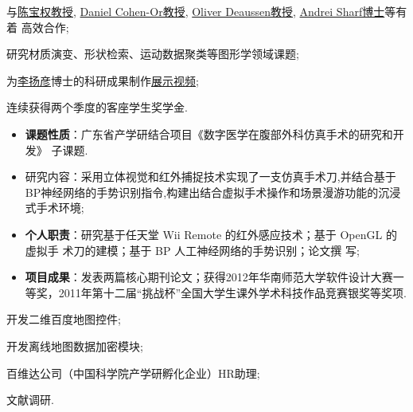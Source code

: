 \documentclass[11pt,a4paper,nolmodern]{moderncv}
\begin{document}

{
\begin{tightitemize}%
 \item 与\href{http://web.siat.ac.cn/~baoquan/}{陈宝权教授},
   \href{http://www.math.tau.ac.il/~dcor/}{Daniel Cohen-Or教授},
   \href{http://graphics.uni-konstanz.de/mitarbeiter/deussen.php}{Oliver
     Deaussen教授}, \href{http://www.idav.ucdavis.edu/~asharf/}{Andrei Sharf博士}等有着
   高效合作;
 \item 研究材质演变、形状检索、运动数据聚类等图形学领域课题;
 \item 为\href{http://web.siat.ac.cn/~yangyan/}{李扬彦}博士的科研成果制作\href{http://hahack.com/life/video-released}{展示视频};
  \item 连续获得两个季度的客座学生奖学金.
 \end{tightitemize}}

%
  {
\begin{itemize}
 \item \textbf{课题性质}：广东省产学研结合项目《数字医学在腹部外科仿真手术的研究和开发》 子课题.
 \item 研究内容：采用立体视觉和红外捕捉技术实现了一支仿真手术刀,并结合基于BP神经网络的手势识别指令,构建出结合虚拟手术操作和场景漫游功能的沉浸式手术环境;
 \item \textbf{个人职责}：研究基于任天堂 Wii Remote 的红外感应技术；基于 OpenGL 的虚拟手
   术刀的建模；基于 BP 人工神经网络的手势识别；论文撰
   写;
 \item \textbf{项目成果}：发表两篇核心期刊论文；获得2012年华南师范大学软件设计大赛一等奖，2011年第十二届“挑战杯”全国大学生课外学术科技作品竞赛银奖等奖项.
\end{itemize}}

{
\begin{tightitemize}%
 \item 开发二维百度地图控件;
 \item 开发离线地图数据加密模块;
 \item 百维达公司（中国科学院产学研孵化企业）HR助理;
 \item 文献调研.
 \end{tightitemize}}
\end{document}
